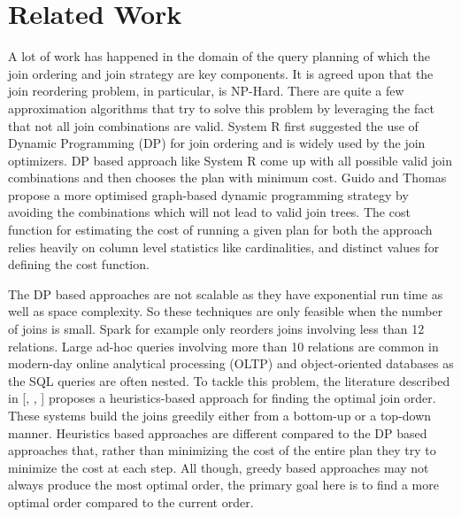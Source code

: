 \section{Related Work}\label{sec:rel_work}
A lot of work has happened in the domain of the query planning of which the join ordering and join strategy are key components. It is agreed upon that the join reordering problem, in particular, is NP-Hard. There are quite a few approximation algorithms that try to solve this problem by leveraging the fact that not all join combinations are valid. System R \cite{b1} first suggested the use of Dynamic Programming (DP) for join ordering and is widely used by the join optimizers. DP based approach like System R come up with all possible valid join combinations and then chooses the plan with minimum cost. Guido and Thomas \cite{b3} propose a more optimised graph-based dynamic programming strategy by avoiding the combinations which will not lead to valid join trees. The cost function for estimating the cost of running a given plan for both the approach relies heavily on column level statistics like cardinalities, and distinct values for defining the cost function.

The DP based approaches are not scalable as they have exponential run time as well as space complexity. So these techniques are only feasible when the number of joins is small. Spark for example only reorders joins involving less than 12 relations. Large ad-hoc queries involving more than 10 relations are common in modern-day online analytical processing (OLTP) and object-oriented databases as the SQL queries are often nested. To tackle this problem,  the literature described in [\cite{b4}, \cite{b5}, \cite{b6}] proposes a heuristics-based approach for finding the optimal join order. These systems build the joins greedily either from a bottom-up or a top-down manner.  Heuristics based approaches are different compared to the DP based approaches that, rather than minimizing the cost of the entire plan they try to minimize the cost at each step. All though, greedy based approaches may not always produce the most optimal order, the primary goal here is to find a more optimal order compared to the current order.

